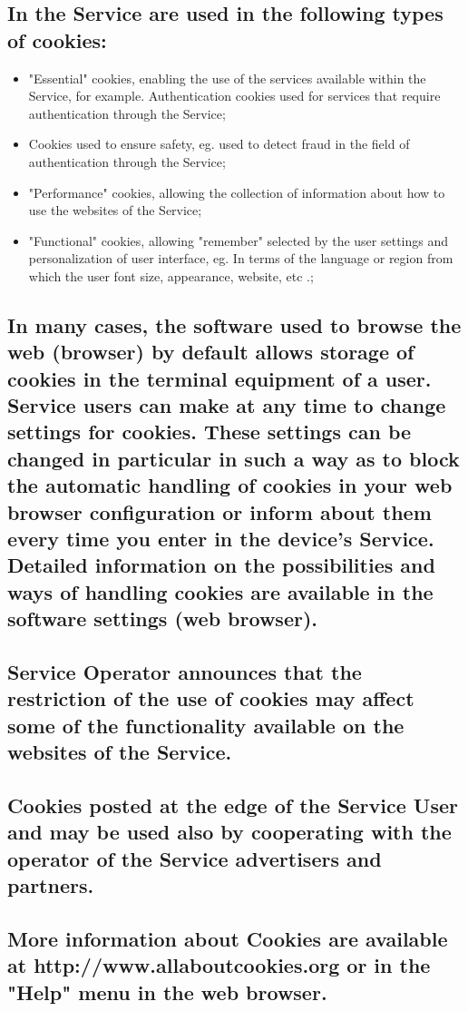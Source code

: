 \subsection{In the Service are used in the following types of cookies:}
	\begin{itemize}
		\item "Essential" cookies, enabling the use of the services available within the Service, for example. Authentication cookies used for services that require authentication through the Service;

		\item Cookies used to ensure safety, eg. used to detect fraud in the field of authentication through the Service;

		\item "Performance" cookies, allowing the collection of information about how to use the websites of the Service;

		\item "Functional" cookies, allowing "remember" selected by the user settings and personalization of user interface, eg. In terms of the language or region from which the user font size, appearance, website, etc .;
	\end{itemize}

\subsection{In many cases, the software used to browse the web (browser) by default allows storage of cookies in the terminal equipment of a user. Service users can make at any time to change settings for cookies. These settings can be changed in particular in such a way as to block the automatic handling of cookies in your web browser configuration or inform about them every time you enter in the device's Service. Detailed information on the possibilities and ways of handling cookies are available in the software settings (web browser).}

\subsection{Service Operator announces that the restriction of the use of cookies may affect some of the functionality available on the websites of the Service.}

\subsection{Cookies posted at the edge of the Service User and may be used also by cooperating with the operator of the Service advertisers and partners.}

\subsection{More information about Cookies are available at http://www.allaboutcookies.org or in the "Help" menu in the web browser.}
 
